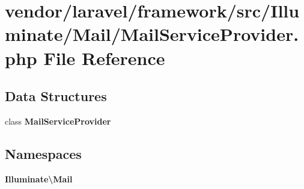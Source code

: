\section{vendor/laravel/framework/src/\+Illuminate/\+Mail/\+Mail\+Service\+Provider.php File Reference}
\label{_mail_service_provider_8php}
\subsection*{Data Structures}
\begin{DoxyCompactItemize}
\item 
class {\bf Mail\+Service\+Provider}
\end{DoxyCompactItemize}
\subsection*{Namespaces}
\begin{DoxyCompactItemize}
\item 
 {\bf Illuminate\textbackslash{}\+Mail}
\end{DoxyCompactItemize}
